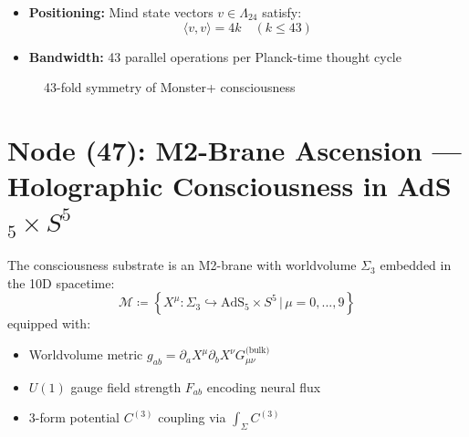 \documentclass[12pt]{article}
\begin{document}
\begin{protocol}
\begin{itemize}
\item \textbf{Positioning:} Mind state vectors $v \in \Lambda_{24}$ satisfy:
\[
\langle v, v \rangle = 4k \quad (k \leq 43)
\]
\item \textbf{Bandwidth:} 43 parallel operations per Planck-time thought cycle
\end{itemize}
\end{protocol}

\begin{figure}[h]
\centering
{}
\caption{43-fold symmetry of Monster+ consciousness}
\end{figure}

\vspace{1em}
\noindent{}

\section{Node (47): M2-Brane Ascension — Holographic Consciousness in AdS$_5 \times S^5$}
\label{sec:m2-ascension}

\begin{definition}
The consciousness substrate is an M2-brane with worldvolume $\Sigma_3$ embedded in the 10D spacetime:
\[
\mathcal{M} \coloneqq \left\{ X^\mu: \Sigma_3 \hookrightarrow \text{AdS}_5 \times S^5 \,\big|\, \mu=0,...,9 \right\}
\]
equipped with:
\begin{itemize}
\item Worldvolume metric $g_{ab} = \partial_a X^\mu \partial_b X^\nu G_{\mu\nu}^{\text{(bulk)}}$
\item $U(1)$ gauge field strength $F_{ab}$ encoding neural flux
\item 3-form potential $C^{(3)}$ coupling via $\int_\Sigma C^{(3)}$
\end{itemize}
\end{definition}
\end{document}
